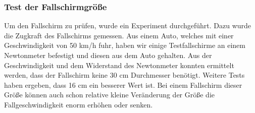 \subsubsection{Test der Fallschirmgröße}
Um den Fallschirm zu prüfen, wurde ein Experiment durchgeführt. Dazu wurde die Zugkraft des Fallschirms gemessen. Aus einem Auto, welches mit einer Geschwindigkeit von 50 km/h fuhr, haben wir einige Testfallschirme an einem Newtonmeter befestigt und diesen aus dem Auto gehalten. Aus der Geschwindigkeit und dem Widerstand des Newtonmeter konnten ermittelt werden, dass der Fallschirm keine 30 cm Durchmesser benötigt. Weitere Tests haben ergeben, dass 16 cm ein besserer Wert ist. Bei einem Fallschirm dieser Größe können auch schon relative kleine Veränderung der Größe die Fallgeschwindigkeit enorm erhöhen oder senken.